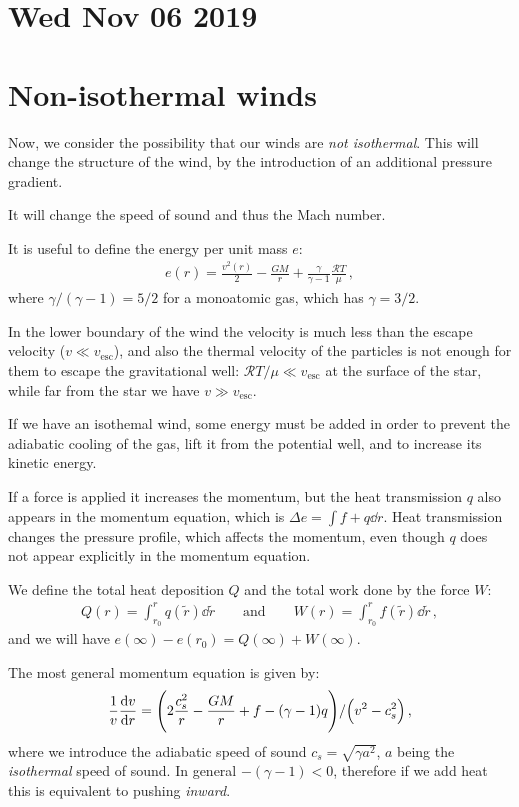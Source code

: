\documentclass[main.tex]{subfiles}
\begin{document}
\section*{Wed Nov 06 2019}

\section{Non-isothermal winds}

Now, we consider the possibility that our winds are \emph{not isothermal}.
This will change the structure of the wind, by the introduction of an additional pressure gradient.

It will change the speed of sound and thus the Mach number.

It is useful to define the energy per unit mass \(e\): 
%
\begin{align}
  e(r) = \frac{v^2(r)}{2} - \frac{GM}{r} + \frac{\gamma }{\gamma -1} \frac{ \mathcal{R} T}{\mu }
\,,
\end{align}
%
where \(\gamma / (\gamma -1) = 5/2\) for a monoatomic gas, which has \(\gamma = 3/2\).

In the lower boundary of the wind the velocity is much less than the escape velocity (\(v \ll v _{\text{esc}}\)), and also the thermal velocity of the particles is not enough for them to escape the gravitational well: \(\mathcal{R} T / \mu \ll v _{\text{esc}}\) at the surface of the star, while far from the star we have \(v \gg v _{\text{esc}}\).

If we have an isothemal wind, some energy must be added in order to prevent the adiabatic cooling of the gas, lift it from the potential well, and to increase its kinetic energy.

If a force is applied it increases the momentum, but the heat transmission \(q\) also appears in the momentum equation, which is \(\Delta e = \int f + q \dd{r} \).
Heat transmission changes the pressure profile, which affects the momentum, even though \(q\) does not appear explicitly in the momentum equation.

We define the total heat deposition \(Q\) and the total work done by the force \(W\):
%
\begin{align}
Q(r) = \int_{r_0 }^{r} q(\widetilde{r}) \dd{\widetilde{r}}
\qquad \text{and} \qquad
W(r) = \int_{r_0 }^{r} f(\widetilde{r}) \dd{\widetilde{r}}
\,,
\end{align}
%
and we will have \(e( \infty ) - e(r_0 ) = Q( \infty ) + W( \infty )\). 

The most general momentum equation is given by: 
%
\begin{align}
  \frac{1}{v} \dv{v}{r} = \qty(2 \frac{c_s^2}{r} - \frac{GM}{r} + f -(\gamma - 1) q) / \qty(v^2- c_s^2)
\,,
\end{align}
%
where we introduce the adiabatic speed of sound \(c_s = \sqrt{\gamma a^2} \), \(a\) being the \emph{isothermal} speed of sound.
In general \(- (\gamma - 1)<0\), therefore if we add heat this is equivalent to pushing \emph{inward}.
\end{document}
